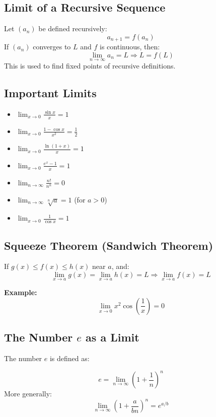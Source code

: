 \subsection{Limit of a Recursive Sequence}

Let \((a_n)\) be defined recursively:
\[
a_{n+1} = f(a_n)
\]
If \((a_n)\) converges to \(L\) and \(f\) is continuous, then:
\[
\lim_{n \to \infty} a_n = L \Rightarrow L = f(L)
\]
This is used to find fixed points of recursive definitions.

\subsection{Important Limits}

\begin{itemize}[label=\(-\)]
\item \(\displaystyle \lim_{x \to 0} \frac{\sin x}{x} = 1\)
\item \(\displaystyle \lim_{x \to 0} \frac{1 - \cos x}{x^2} = \frac{1}{2}\)
\item \(\displaystyle \lim_{x \to 0} \frac{\ln(1 + x)}{x} = 1\)
\item \(\displaystyle \lim_{x \to 0} \frac{e^x - 1}{x} = 1\)
\item \(\displaystyle \lim_{n \to \infty} \frac{n!}{n^n} = 0\)
\item \(\displaystyle \lim_{n \to \infty} \sqrt[n]{a} = 1\) (for \(a > 0\))
\item \(\displaystyle \lim_{x \to 0} \frac{1}{\cos x} = 1\)
\end{itemize}

\subsection{Squeeze Theorem (Sandwich Theorem)}

If \(g(x) \le f(x) \le h(x)\) near \(a\), and:
\[
\lim_{x \to a} g(x) = \lim_{x \to a} h(x) = L
\Rightarrow \lim_{x \to a} f(x) = L
\]

\textbf{Example:}
\[
\lim_{x \to 0} x^2 \cos\left( \frac{1}{x} \right) = 0
\]

\subsection{The Number \texorpdfstring{\(e\)}{e} as a Limit}

The number \(e\) is defined as:

\[
e = \lim_{n \to \infty} \left(1 + \frac{1}{n} \right)^n
\]
More generally:
\[
\lim_{n \to \infty} \left(1 + \frac{a}{bn} \right)^n = e^{a/b}
\]

